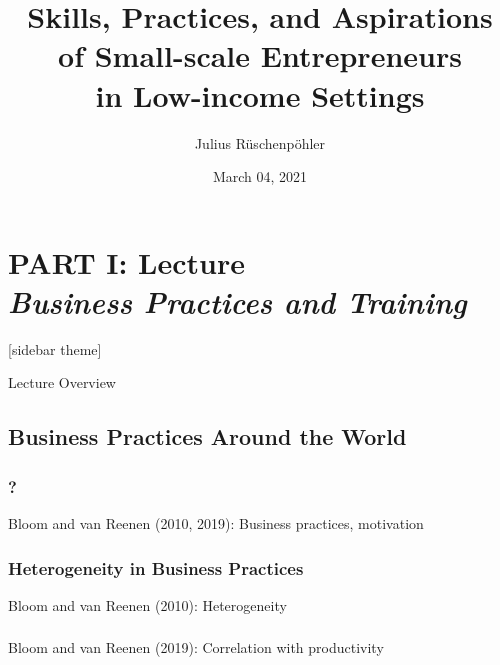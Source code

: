 \documentclass[hideothersubsections, usenames,dvipsnames,11pt]{beamer}
\title[]{Skills, Practices, and Aspirations \\ of Small-scale Entrepreneurs \\ in Low-income Settings}
\author[]{Julius R{\"u}schenp{\"o}hler\inst{}}
\institute[]{\inst{} UC Berkeley, CEGA}
\date{March 04, 2021}
\newenvironment{itemize_3pt}{\itemize\addtolength{\itemsep}{3pt}}{\enditemize}
\begin{document}



\section{\textbf{PART I: Lecture} \\ \quad \emph{Business Practices and Training}}



\begin{frame}
\titlepage
\end{frame}


[sidebar theme]

\begin{frame}{Lecture Overview}
\end{frame}


\subsection{Business Practices Around the World}

\begin{frame}
\frametitle{?}
	\begin{itemize_3pt}
	\item Bloom and van Reenen (2010, 2019): Business practices, motivation \citep{Bloom2010, Bloom2019}
	\vspace{0.1in}
	\end{itemize_3pt}
\end{frame}

\begin{frame}
\frametitle{Heterogeneity in Business Practices}
	\begin{itemize_3pt}
	\item Bloom and van Reenen (2010): Heterogeneity \citep{Bloom2010}
	\vspace{0.1in}
	\end{itemize_3pt}
\end{frame}

\begin{frame}
\frametitle{}
	\begin{itemize_3pt}
	\item Bloom and van Reenen (2019): Correlation with productivity \citep{Bloom2019}
	\vspace{0.1in}
	\end{itemize_3pt}
\end{frame}
\end{document}
